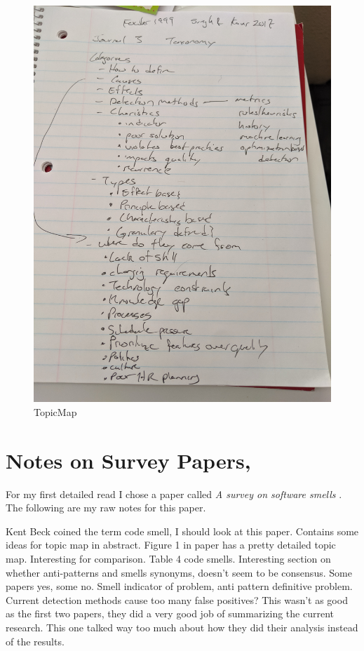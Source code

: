 \documentclass[conference]{IEEEtran}
\begin{document}
\begin{figure}
  \centerline{\includegraphics[width=\textwidth]{taxonomy_notes.jpg}}
  \caption{TopicMap}
  \label{fig:TN}
\end{figure} 
\section{Notes on Survey Papers, }
For my first detailed read I chose a paper called  \textit{A survey on software smells} \cite{sharma_survey_2018}.
The following are my raw notes for this paper.

Kent Beck coined the term code smell, I should look at this paper.
Contains some ideas for topic map in abstract.
Figure 1 in paper has a pretty detailed topic map.
Interesting for comparison.
Table 4 code smells.
Interesting section on whether anti-patterns and smells synonyms, doesn't seem to be consensus. Some papers yes, some no.
Smell indicator of problem, anti pattern definitive problem.
Current detection methods cause too many false positives?
This wasn't as good as the first two papers, they did a very good job of summarizing the current research. This one talked way too much about how they did their analysis instead of the results.
\end{document}
